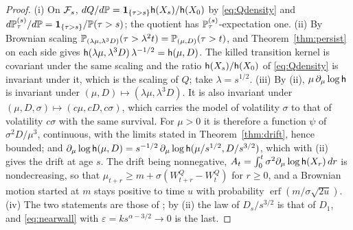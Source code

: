 \begin{proof}
(i) On $\mathcal{F}_s$, $dQ/d\mathbb{P}=\mathbf{1}_{\{\tau>s\}}\mathsf{h}(X_s)/\mathsf{h}(X_0)$ by
\eqref{eq:Qdensity} and
$d\mathbb{P}^{(s)}_\tau/d\mathbb{P}=\mathbf{1}_{\{\tau>s\}}/\mathbb{P}(\tau>s)$; the quotient has
$\mathbb{P}^{(s)}_\tau$-expectation one. (ii) By Brownian scaling
$\mathbb{P}_{(\lambda\mu,\lambda^3D)}(\tau>\lambda^2t)=\mathbb{P}_{(\mu,D)}(\tau>t)$,
and Theorem~\ref{thm:persist} on each side gives
$\mathsf{h}(\lambda\mu,\lambda^3D)\,\lambda^{-1/2}=\mathsf{h}(\mu,D)$. The killed
transition kernel is covariant under the same scaling and the ratio
$\mathsf{h}(X_s)/\mathsf{h}(X_0)$ of \eqref{eq:Qdensity} is invariant under it, which
is the scaling of $Q$; take $\lambda=s^{1/2}$. (iii) By (ii),
$\mu\,\partial_\mu\log\mathsf{h}$ is invariant under
$(\mu,D)\mapsto(\lambda\mu,\lambda^3D)$. It is also invariant under
$(\mu,D,\sigma)\mapsto(c\mu,cD,c\sigma)$, which carries the model of
volatility $\sigma$ to that of volatility $c\sigma$ with the same
survival. For $\mu>0$ it is therefore a function $\psi$ of
$\sigma^2D/\mu^3$, continuous, with the limits stated in
Theorem~\ref{thm:drift}, hence bounded; and
$\partial_\mu\log\mathsf{h}(\mu,D)=s^{-1/2}\,\partial_\mu\log\mathsf{h}(\mu/s^{1/2},D/s^{3/2})$,
which with (ii) gives the drift at age $s$. The drift being nonnegative,
$A_t=\int_0^t\sigma^2\partial_\mu\log\mathsf{h}(X_r)\,dr$ is nondecreasing, so
that $\mu_{t+r}\ge m+\sigma(W^Q_{t+r}-W^Q_t)$ for $r\ge0$, and a Brownian
motion started at $m$ stays positive to time $u$ with probability
$\operatorname{erf}(m/\sigma\sqrt{2u})$. (iv) The two statements are
those of \cite{GJW99}; by (ii) the law of $D_s/s^{3/2}$ is that of $D_1$,
and \eqref{eq:nearwall} with $\varepsilon=ks^{\alpha-3/2}\to0$ is the
last.
\end{proof}

